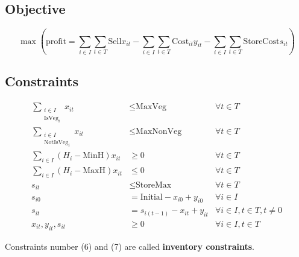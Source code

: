 \documentclass[12pt, a4paper]{amsart}
\begin{document}
	\subsection*{Objective}
	\[
		\max \left( \text{profit}=\sum_{i\in I} \sum_{t \in T} \text{Sell}x_{it} - \sum_{i\in I} \sum_{t \in T}\text{Cost}_{it} y_{it} - \sum_{i \in I} \sum_{t \in T} \text{StoreCost} s_{it} \right)
	\]

	\subsection*{Constraints}

	\begin{align}
		\sum_{\substack{i \in I \\ \text{IsVeg}_i}} x_{it} &\leq \text{MaxVeg} & \forall t \in T \\
		\sum_{\substack{i \in I \\ \text{NotIsVeg}_i}} x_{it} &\leq \text{MaxNonVeg} & \forall t \in T \\
		\sum_{i \in I} (H_i - \text{MinH})x_{it} &\geq 0 &\forall t \in T \\
		\sum_{i \in I} (H_i - \text{MaxH})x_{it} &\leq 0 &\forall t \in T \\
		s_{it} &\leq \text{StoreMax} &\forall t \in T \\
		s_{i0} &= \text{Initial} - x_{i0} + y_{i0} &\forall i \in I \\
		s_{it} &= s_{i(t-1)} - x_{it} + y_{it} &\forall i \in I, t \in T, t \neq 0 \\
		x_{it}, y_{it}, s_{it} &\geq 0  &\forall i \in I, t \in T
	\end{align}

\begin{note}
Constraints number (6) and (7) are called \textbf{inventory constraints}.
\end{note}
\end{document}
